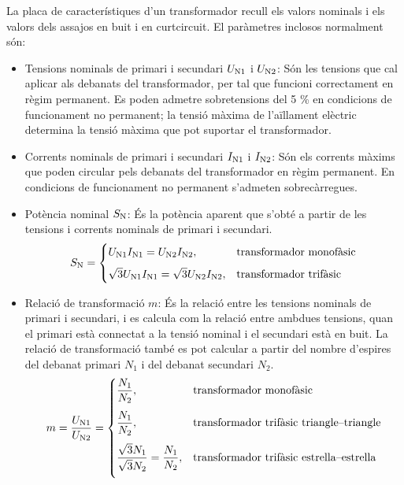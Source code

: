 La  placa de característiques d'un transformador recull els valors nominals  i els valors dels assajos
en buit i en curtcircuit. El paràmetres inclosos normalment són:
\begin{itemize}
   \item Tensions nominals de primari i secundari  $U_\mathrm{N1}$ i $U_\mathrm{N2}$: Són les tensions que cal aplicar als debanats del transformador, per tal que funcioni correctament en règim permanent. Es poden admetre sobretensions del 5 \% en condicions de funcionament no permanent; la tensió màxima de l'aïllament elèctric determina la tensió màxima que pot suportar el transformador.
   \item Corrents nominals de primari i secundari  $I_\mathrm{N1}$ i $I_\mathrm{N2}$: Són els corrents màxims que poden circular pels debanats del transformador en règim permanent. En condicions de funcionament no permanent s'admeten sobrecàrregues.
   \item Potència nominal $S_\mathrm{N}$: És la potència aparent que s'obté a partir de les tensions i corrents nominals de primari i secundari.
       \begin{equation}
        S_\mathrm{N} = \begin{cases} U_\mathrm{N1} I_\mathrm{N1} = U_\mathrm{N2} I_\mathrm{N2}, & \text{transformador monofàsic} \\[2mm]
        \sqrt{3} U_\mathrm{N1} I_\mathrm{N1} = \sqrt{3} U_\mathrm{N2} I_\mathrm{N2}, & \text{transformador trifàsic} \end{cases}
       \end{equation}
   \item Relació de transformació $m$: És la relació entre les tensions nominals de primari i secundari, i es calcula com la relació entre ambdues tensions, quan el primari està connectat a la tensió nominal i el secundari està en buit. La relació de  transformació també es pot calcular a partir del nombre d'espires del debanat primari $N_1$ i del debanat secundari $N_2$.
       \begin{equation}
        m = \frac{U_\mathrm{N1}}{U_\mathrm{N2}} =  \begin{cases}
        \dfrac{N_1}{N_2}, & \text{transformador monofàsic} \\[0.4cm]
        \dfrac{N_1}{N_2}, & \text{transformador trifàsic triangle--triangle} \\[0.4cm]
        \dfrac{\sqrt{3}N_1}{\sqrt{3}N_2} = \dfrac{N_1}{N_2}, & \text{transformador trifàsic estrella--estrella} \\[0.4cm]

\end{cases}
\end{equation}
\end{itemize}
